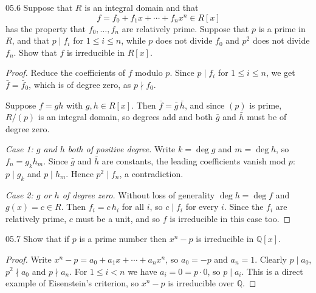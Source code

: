 \documentclass[11pt]{article}
\begin{document}
\begin{problem}{05.6}
  Suppose that $R$ is an integral domain and that
  \[
    f = f_0 + f_1 x + \cdots + f_n x^n \in R[x]
  \]
  has the property that $f_0, \ldots, f_n$ are relatively prime. Suppose that
  $p$ is a prime in $R$, and that $p \mid f_i$ for $1 \leq i \leq n$, while $p$
  does not divide $f_0$ and $p^2$ does not divide $f_n$. Show that $f$ is
  irreducible in $R[x]$.
\end{problem}
\begin{proof}
Reduce the coefficients of $f$ modulo $p$. Since $p \mid f_i$ for
$1 \le i \le n$, we get $\bar f = \bar f_0$, which is of degree zero, as
$p \nmid f_0$.

Suppose $f = gh$ with $g, h \in R[x]$. Then $\bar f = \bar g\,\bar h$, and since
$(p)$ is prime, $R/(p)$ is an integral domain, so degrees add and both $\bar g$
and $\bar h$ must be of degree zero.

\emph{Case 1: $g$ and $h$ both of positive degree.} Write $k = \deg g$ and
$m = \deg h$, so $f_n = g_k h_m$. Since $\bar g$ and $\bar h$ are constants, the
leading coefficients vanish mod $p$: $p \mid g_k$ and $p \mid h_m$. Hence
$p^2 \mid f_n$, a contradiction.

\emph{Case 2: $g$ or $h$ of degree zero.} Without loss of generality
$\deg h = \deg f$ and $g(x) = c \in R$. Then $f_i = c\,h_i$ for all $i$, so
$c \mid f_i$ for every $i$. Since the $f_i$ are relatively prime, $c$ must be a
unit, and so $f$ is irreducible in this case too.
\end{proof}

\begin{problem}{05.7}
  Show that if $p$ is a prime number then $x^n - p$ is irreducible in
  $\mathbb{Q}[x]$.
\end{problem}
\begin{proof}
Write $x^n - p = a_0 + a_1 x + \cdots + a_n x^n$, so $a_0 = -p$ and $a_n = 1$.
Clearly $p \mid a_0$, $p^2 \nmid a_0$ and $p \nmid a_n$. For $1 \le i < n$ we
have $a_i = 0 = p \cdot 0$, so $p \mid a_i$. This is a direct example of
Eisenstein's criterion, so $x^n - p$ is irreducible over $\mathbb{Q}$.
\end{proof}
\end{document}

